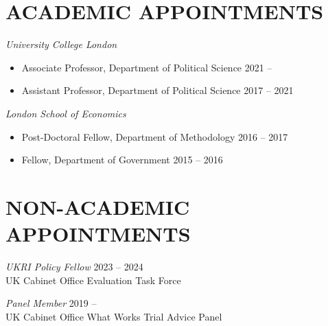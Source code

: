 \documentclass[centered]{res}
\begin{document}
 
\address{Department of Political Science \\ University College London\\ Gower Street \\ London \\ WC1E 6BT }

\address{\faEnvelope \hfil \textcolor{white}{hi}\href{mailto:j.blumenau@ucl.ac.uk}{j.blumenau@ucl.ac.uk} \\ \faHome \hfil\href{http://www.jackblumenau.com}{jackblumenau.com} }%

 
\begin{resume}

\section{ACADEMIC APPOINTMENTS} 

\vspace{.5cm}

\emph{University College London}

\begin{itemize}
\item Associate Professor, Department of Political Science \hfill 2021 --
\item Assistant Professor, Department of Political Science \hfill 2017 -- 2021
\end{itemize}

\emph{London School of Economics}

\begin{itemize}
\item Post-Doctoral Fellow, Department of Methodology \hfill 2016 -- 2017
\item Fellow, Department of Government \hfill 2015 -- 2016
\end{itemize}

\section{NON-ACADEMIC APPOINTMENTS}

\vspace{.5cm}

{\sl UKRI Policy Fellow} \hfill 2023 -- 2024\\
UK Cabinet Office Evaluation Task Force

{\sl Panel Member} \hfill 2019 --\\
UK Cabinet Office What Works Trial Advice Panel


\end{resume}
\end{document}
